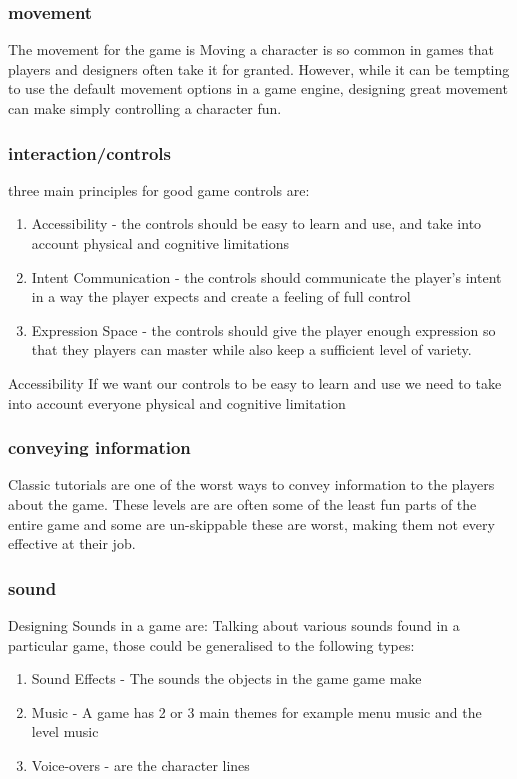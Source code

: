 \documentclass{article}
\begin{document}
\subsubsection{movement}
The movement for the game is
Moving a character is so common in games that players and designers often take it for granted. However, while it can be tempting to use the default movement options in a game engine, designing great movement can make simply controlling a character fun. 

\subsubsection{interaction/controls}
three main principles for good game controls are:
\begin{enumerate}
	\item Accessibility - the controls should be easy to learn and use, and take into account physical and cognitive limitations
	\item Intent Communication - the controls should communicate the player's intent in a way the player expects and create a feeling of full control
	\item Expression Space - the controls should give the player enough expression so that they players can master while also keep a sufficient level of variety.
\end{enumerate}

Accessibility 
If we want our controls to be easy to learn and use we need to take into account everyone physical and cognitive limitation 

\subsubsection{conveying information}
Classic tutorials are one of the worst ways to convey information to the players about the game. These levels are are often some of the least fun parts of the entire game and some are un-skippable these are worst, making them not every effective at their job.

\subsubsection{sound}
Designing Sounds in a game are:
Talking about various sounds found in a particular game, those could be generalised to the following types: 
\begin{enumerate}
	\item Sound Effects - The sounds the objects in the game game make
	\item Music -  A game has 2 or 3 main themes for example menu music and the level music
	\item Voice-overs - are the character lines
\end{enumerate}
\end{document}
